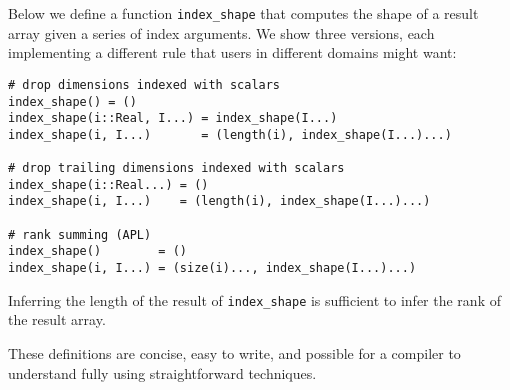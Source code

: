 Below we define a function \texttt{index\_shape} that computes the
shape of a result array given a series of index arguments.
We show three versions, each implementing a different rule that users in
different domains might want:


\vspace{-3ex}
\begin{singlespace}
\begin{verbatim}
# drop dimensions indexed with scalars
index_shape() = ()
index_shape(i::Real, I...) = index_shape(I...)
index_shape(i, I...)       = (length(i), index_shape(I...)...)

# drop trailing dimensions indexed with scalars
index_shape(i::Real...) = ()
index_shape(i, I...)    = (length(i), index_shape(I...)...)

# rank summing (APL)
index_shape()        = ()
index_shape(i, I...) = (size(i)..., index_shape(I...)...)
\end{verbatim}
\end{singlespace}

Inferring the length of the result of \texttt{index\_shape} is sufficient
to infer the rank of the result array.

These definitions are concise, easy to write, and possible for a
compiler to understand fully using straightforward techniques.




